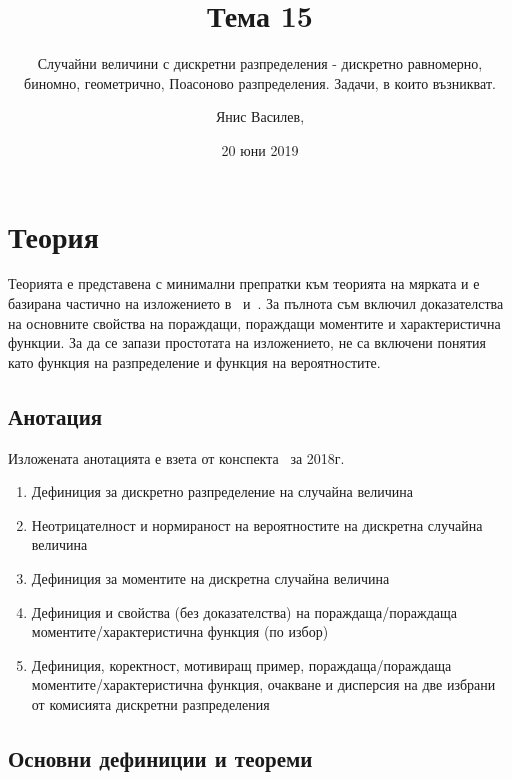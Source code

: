 \documentclass[numbers=endperiod, DIV=15, bibliography=totocnumbered]{scrartcl}
\title{Тема 15}
\subtitle{Случайни величини с дискретни разпределения - дискретно равномерно, биномно, геометрично, Поасоново разпределения. Задачи, в които възникват.}
\author{Янис Василев, \Email{ianis@ivasilev.net}}
\date{20 юни 2019}
\begin{document}
\maketitle

\section{Теория}

Теорията е представена с минимални препратки към теорията на мярката и е базирана частично на изложението в~\cite{Borovkov} и~\cite{DimitrovYanev}. За пълнота съм включил доказателства на основните свойства на пораждащи, пораждащи моментите и характеристична функции. За да се запази простотата на изложението, не са включени понятия като функция на разпределение и функция на вероятностите.

\subsection{Анотация}

Изложената анотацията е взета от конспекта~\cite{Syllabus} за 2018г.

\begin{enumerate}
  \item Дефиниция за дискретно разпределение на случайна величина
  \item Неотрицателност и нормираност на вероятностите на дискретна случайна величина
  \item Дефиниция за моментите на дискретна случайна величина
  \item Дефиниция и свойства (без доказателства) на пораждаща/пораждаща моментите/характеристична функция (по избор)
  \item Дефиниция, коректност, мотивиращ пример, пораждаща/пораждаща моментите/характеристична функция, очакване и дисперсия на две избрани от комисията дискретни разпределения
\end{enumerate}

\subsection{Основни дефиниции и теореми}
\end{document}
